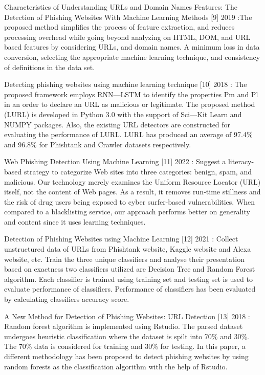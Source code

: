\hspace{.2cm} Characteristics of Understanding URLs and Domain Names Features: The Detection of Phishing Websites With Machine Learning Methods [9] 2019 :The proposed method simplifies the process of feature extraction, and reduces processing overhead while going beyond analyzing on HTML, DOM, and URL based features by considering URLs, and domain names. A minimum loss in data conversion, selecting the appropriate machine learning technique, and consistency of definitions in the data set.



\hspace{.2cm} Detecting phishing websites using machine learning technique [10] 2018 : The proposed framework employs RNN—LSTM to identify the properties Pm and Pl in an order to declare an URL as malicious or legitimate. The proposed method (LURL) is developed in Python 3.0 with the support of Sci—Kit Learn and NUMPY packages. Also, the existing URL detectors are constructed for evaluating the performance of LURL. LURL has produced an average of 97.4\% and 96.8\% for Phishtank and Crawler datasets respectively.



\hspace{.2cm} Web Phishing Detection Using Machine Learning 
[11] 2022 : Suggest a literacy-based strategy to categorize Web sites into three
categories: benign, spam, and malicious. Our technology merely
examines the Uniform Resource Locator (URL) itself, not the
content of Web pages. As a result, it removes run-time stillness
and the risk of drug users being exposed to cyber surfer-based
vulnerabilities. When compared to a blacklisting service, our
approach performs better on generality and content since it uses
learning techniques.


\hspace{.2cm} Detection of Phishing Websites using Machine Learning [12] 2021 : Collect unstructured data of URLs from Phishtank website, Kaggle website and Alexa website, etc.
Train the three unique classifiers and analyse their presentation based on exactness two classifiers utilized are Decision Tree and Random Forest algorithm. Each classifier is trained using training set and testing set is used to evaluate performance of classifiers.
Performance of classifiers has been evaluated by calculating classifiers accuracy score.


 

\hspace{.2cm} A New Method for Detection of Phishing Websites: URL Detection
[13] 2018 : Random forest algorithm is implemented using Rstudio. The parsed dataset undergoes heuristic classification where the dataset is spilt into 70\% and 30\%. The 70\% data is considered for training and 30\% for testing. In this paper, a different methodology has been proposed to detect phishing websites by using random forests as the classification algorithm with the help of Rstudio.



